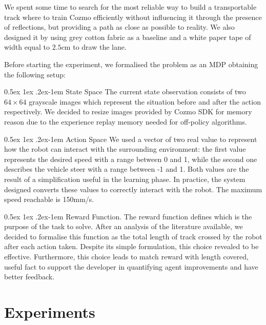 \documentclass[10pt,twocolumn,letterpaper]{article}
\makeatletter
\renewcommand{\paragraph}{%
  \@startsection{paragraph}{4}%
  {\z@}{0.5ex \@plus 1ex \@minus .2ex}{-1em}%
  {\normalfont\normalsize\bfseries}%
}
\makeatother
\begin{document}
We spent some time to search for the most reliable way to build a transportable track where to train Cozmo efficiently without influencing it through the presence of reflections, but providing a path as close as possible to reality.
We also designed it by using grey cotton fabric as a baseline and a white paper tape of width equal to $2.5$cm to draw the lane.

Before starting the experiment, we formalised the problem as an MDP obtaining the following setup:

\paragraph{State Space} The current state observation consists of two $64 \times 64$ grayscale images which represent the situation before and after the action respectively. We decided to resize images provided by Cozmo SDK for memory reason due to the experience replay memory needed for off-policy algorithms.

\paragraph{Action Space} We used a vector of two real value to represent how the robot can interact with the surrounding environment: the first value represents the desired speed with a range between 0 and 1, while the second one describes the vehicle steer with a range between -1 and 1. Both values are the result of a simplification useful in the learning phase. In practice, the system designed converts these values to correctly interact with the robot. The maximum speed reachable is 150mm/s.

\paragraph{Reward Function}. The reward function defines which is the purpose of the task to solve. After an analysis of the literature available, we decided to formalise this function as the total length of track crossed by the robot after each action taken. Despite its simple formulation, this choice revealed to be effective.
Furthermore, this choice leads to match reward with length covered, useful fact to support the developer in quantifying agent improvements and have better feedback.

\section{Experiments}
\end{document}
